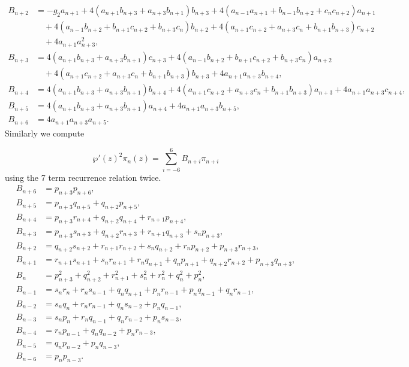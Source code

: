 \documentclass[11pt,a4paper]{article}
\theoremstyle{definition}
\numberwithin{equation}{section}
\numberwithin{theorem}{section}
\begin{document}
\begin{align*}
B_{n+2} &= -g_2 a_{n+1} + 4 (a_{n+1} b_{n+3} + a_{n+3} b_{n+1}) b_{n+3} + 4 (a_{n-1} a_{n+1} + b_{n-1} b_{n+2} + c_n c_{n+2}) a_{n+1} \\&\quad + 4 (a_{n-1} b_{n+2} + b_{n+1} c_{n+2} + b_{n+3} c_n) b_{n+2} + 4 (a_{n+1} c_{n+2} + a_{n+3} c_n + b_{n+1} b_{n+3}) c_{n+2} \\&\quad + 4 a_{n+1} a_{n+3}^2, \\
B_{n+3} &= 4 (a_{n+1} b_{n+3} + a_{n+3} b_{n+1}) c_{n+3} + 4 (a_{n-1} b_{n+2} + b_{n+1} c_{n+2} + b_{n+3} c_n) a_{n+2} \\&\quad + 4 (a_{n+1} c_{n+2} + a_{n+3} c_n + b_{n+1} b_{n+3}) b_{n+3} + 4 a_{n+1} a_{n+3} b_{n+4}, \\
B_{n+4} &= 4 (a_{n+1} b_{n+3} + a_{n+3} b_{n+1}) b_{n+4} + 4 (a_{n+1} c_{n+2} + a_{n+3} c_n + b_{n+1} b_{n+3}) a_{n+3} + 4 a_{n+1} a_{n+3} c_{n+4}, \\
B_{n+5} &= 4 (a_{n+1} b_{n+3} + a_{n+3} b_{n+1}) a_{n+4} + 4 a_{n+1} a_{n+3} b_{n+5}, \\
B_{n+6} &= 4 a_{n+1} a_{n+3} a_{n+5}.
\end{align*}
Similarly we compute 

\begin{equation}
    \wp'(z)^2\pi_{n}(z)=\sum_{i=-6}^{6}B_{n+i}\pi_{n+i}
\end{equation}
using the 7 term recurrence relation twice.
\begin{align*}
B_{n+6} &= p_{n+3} p_{n+6}, \\
B_{n+5} &= p_{n+3} q_{n+5} + q_{n+2} p_{n+5}, \\
B_{n+4} &= p_{n+3} r_{n+4} + q_{n+2} q_{n+4} + r_{n+1} p_{n+4}, \\
B_{n+3} &= p_{n+3} s_{n+3} + q_{n+2} r_{n+3} + r_{n+1} q_{n+3} + s_n p_{n+3}, \\
B_{n+2} &= q_{n+2} s_{n+2} + r_{n+1} r_{n+2} + s_n q_{n+2} + r_n p_{n+2}+p_{n+3}r_{n+3}, \\
B_{n+1} &= r_{n+1} s_{n+1} + s_n r_{n+1} + r_n q_{n+1} + q_n p_{n+1}+q_{n+2}r_{n+2}+p_{n+3}q_{n+3}, \\
B_n &= p_{n+3}^2 + q_{n+2}^2 + r_{n+1}^2 + s_n^2 + r_n^2 + q_n^2 + p_n^2, \\
B_{n-1} &= s_n r_n + r_n s_{n-1} + q_n q_{n+1} + p_n r_{n-1}+p_{n}q_{n-1}+q_{n}r_{n-1}, \\
B_{n-2} &= s_n q_n + r_n r_{n-1} + q_n s_{n-2} + p_n q_{n-1}, \\
B_{n-3} &= s_n p_n + r_n q_{n-1} + q_n r_{n-2} + p_n s_{n-3}, \\
B_{n-4} &= r_n p_{n-1} + q_n q_{n-2} + p_n r_{n-3}, \\
B_{n-5} &= q_n p_{n-2} + p_n q_{n-3}, \\
B_{n-6} &= p_{n} p_{n-3}.
\end{align*}

 

\end{document}
